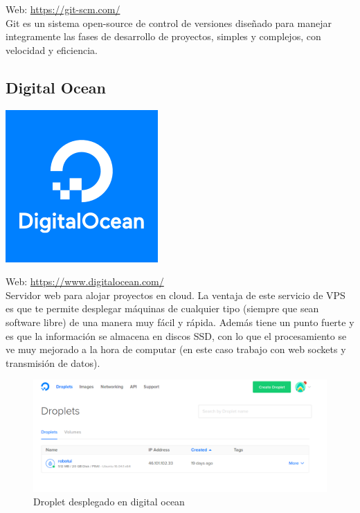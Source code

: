 Web: \url{https://git-scm.com/}\\

Git es un sistema open-source de control de versiones diseñado para manejar integramente las fases de desarrollo de proyectos, simples y complejos, con velocidad y eficiencia.\\

\subsection{Digital Ocean}

\begin{center}\includegraphics[scale=0.35]{imagenes/docean-logo.png}\end{center}

Web: \url{https://www.digitalocean.com/}\\

Servidor web para alojar proyectos en cloud. La ventaja de este servicio de VPS es que te permite desplegar máquinas de cualquier tipo (siempre que sean software libre) de una manera muy fácil y rápida. Además tiene un punto fuerte y es que la información se almacena en discos SSD, con lo que el procesamiento se ve muy mejorado a la hora de computar (en este caso trabajo con web sockets y transmisión de datos).\\

\begin{figure}[H]
\begin{center}
\includegraphics[scale=0.45]{imagenes/droplets.png}
\caption{Droplet desplegado en digital ocean}
\end{center}
\end{figure}


